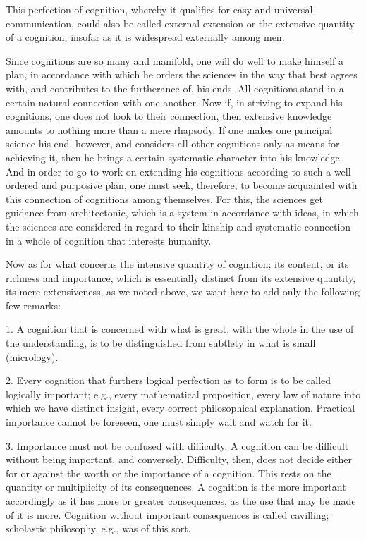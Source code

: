 This perfection of cognition, whereby it qualifies for easy and universal
communication, could also be called external extension or the extensive
quantity of a cognition, insofar as it is widespread externally among men.

Since cognitions are so many and manifold, one will do well to make
himself a plan, in accordance with which he orders the sciences in the way
that best agrees with, and contributes to the furtherance of, his ends. All
cognitions stand in a certain natural connection with one another. Now if,
in striving to expand his cognitions, one does not look to their connection,
then extensive knowledge amounts to nothing more than a mere rhapsody.
If one makes one principal science his end, however, and
considers all other cognitions only as means for achieving it,
then he brings a certain systematic character into his knowledge.
And in order to go to work on extending his cognitions
according to such a well ordered and purposive plan,
one must seek, therefore, to become acquainted with
this connection of cognitions among themselves.
For this, the sciences get guidance from architectonic,
which is a system in accordance with ideas,
in which the sciences are considered in regard to their kinship and
systematic connection in a whole of cognition that interests humanity.

Now as for what concerns the intensive quantity of cognition;
its content, or its richness and importance,
which is essentially distinct from its extensive quantity,
its mere extensiveness, as we noted above,
we want here to add only the following few remarks:

1. A cognition that is concerned with what is great,
with the whole in the use of the understanding,
is to be distinguished from subtlety in what is small (micrology).

2. Every cognition that furthers logical perfection
as to form is to be called logically important;
e.g., every mathematical proposition, every law of nature
into which we have distinct insight, every correct philosophical explanation.
Practical importance cannot be foreseen, one must simply wait and watch for it.

3. Importance must not be confused with difficulty.
A cognition can be difficult without being important, and conversely.
Difficulty, then, does not decide either for or against
the worth or the importance of a cognition.
This rests on the quantity or multiplicity of its consequences.
A cognition is the more important accordingly as
it has more or greater consequences, as the use that
may be made of it is more.
Cognition without important consequences is called cavilling;
scholastic philosophy, e.g., was of this sort.

